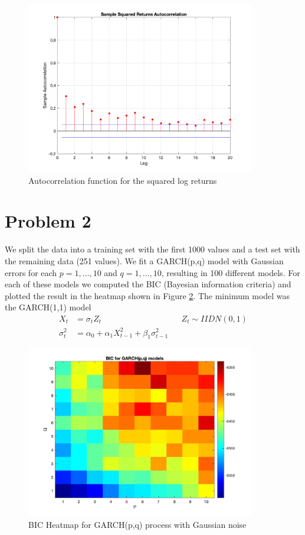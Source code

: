 \documentclass{article}
\begin{document}
\begin{figure}[H]
\includegraphics[width=10cm]{plots/acf_square_rtns.png}
\centering
\caption{Autocorrelation function for the squared log returns}
\label{fig:acf_square_rtns}
\end{figure}

\section*{Problem 2}

We split the data into a training set with the first 1000 values and a test set with the remaining data (251 values).
We fit a GARCH(p,q) model with Gaussian errors for each $p = 1, \ldots, 10$ and $q = 1, \ldots, 10$, resulting in 100 different models.
For each of these models we computed the BIC (Bayesian information criteria) and plotted the result in the heatmap shown in Figure \ref{fig:bic_heatmap_norm}.
The minimum model was the GARCH(1,1) model
\begin{align*}
X_t &= \sigma_t Z_t && Z_t \sim IIDN(0, 1)\\
\sigma_t^2 &= \alpha_0 + \alpha_1 X_{t - 1}^2 + \beta_1 \sigma_{t - 1}^2
\end{align*}

\begin{figure}[H]
\includegraphics[width=10cm]{plots/bic_heatmap_norm.png}
\centering
\caption{BIC Heatmap for GARCH(p,q) process with Gaussian noise}
\label{fig:bic_heatmap_norm}
\end{figure}
\end{document}

